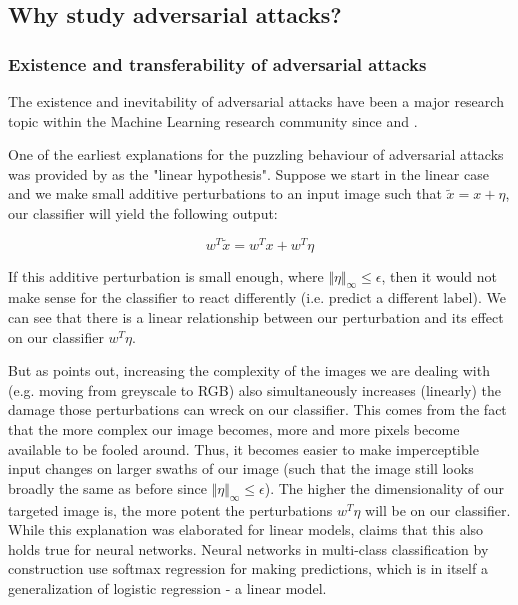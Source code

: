 \subsection{Why study adversarial attacks?}

\subsubsection{Existence and transferability of adversarial attacks}

The existence and inevitability of adversarial attacks have been a major research topic within the Machine Learning research community since \cite{Szegedy2014} and \cite{Goodfellow2014}.

One of the earliest explanations for the puzzling behaviour of adversarial attacks was provided by \cite{Goodfellow2014} as the "linear hypothesis". Suppose we start in the linear case and we make small additive perturbations to an input image such that $\tilde x = x + \eta $, our classifier will yield the following output:

$$ w^T \tilde x = w^T x + w^T \eta $$

If this additive perturbation is small enough, where $\Vert \eta \Vert_{\infty} \leq \epsilon$, then it would not make sense for the classifier to react differently (i.e. predict a different label). We can see that there is a linear relationship between our perturbation and its effect on our classifier $ w^T \eta $.

But as \cite{Goodfellow2014} points out, increasing the complexity of the images we are dealing with (e.g. moving from greyscale to RGB) also simultaneously increases (linearly) the damage those perturbations can wreck on our classifier. This comes from the fact that the more complex our image becomes, more and more pixels become available to be fooled around. Thus, it becomes easier to make imperceptible input changes on larger swaths of our image (such that the image still looks broadly the same as before since $\Vert \eta \Vert_{\infty} \leq \epsilon$). The  higher the dimensionality of our targeted image is, the more potent the perturbations $ w^T \eta $ will be on our classifier. While this explanation was elaborated for linear models, \cite{Goodfellow2014} claims that this also holds true for neural networks. Neural networks in multi-class classification by construction use softmax regression for making predictions, which is in itself a generalization of logistic regression - a linear model.


